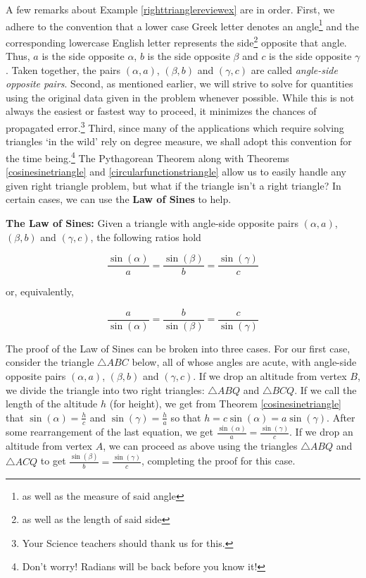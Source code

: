 \begin{ex}
\end{ex} 

A few remarks about Example \ref{righttrianglereviewex}  are in order.  First, we adhere to the convention that a lower case Greek letter denotes an angle\footnote{as well as the measure of said angle} and the corresponding lowercase English letter represents the side\footnote{as well as the length of said side} opposite that angle.  Thus, $a$ is the side opposite $\alpha$, $b$ is the side opposite $\beta$ and $c$ is the side opposite $\gamma$.  Taken together, the pairs $(\alpha, a)$, $(\beta, b)$ and $(\gamma, c)$ are called  \textit{angle-side opposite pairs}.  Second, as mentioned earlier, we will strive to solve for quantities using the original data given in the problem whenever possible. While this is not always the easiest or fastest way to proceed, it minimizes the chances of propagated error.\footnote{Your Science teachers should thank us for this.}  Third, since many of the applications which require solving triangles `in the wild' rely on degree measure, we shall adopt this convention for the time being.\footnote{Don't worry!  Radians will be back before you know it!}  The Pythagorean Theorem along with Theorems \ref{cosinesinetriangle} and \ref{circularfunctionstriangle} allow us to easily handle any given right triangle problem, but what if the triangle isn't a right triangle?  In certain cases, we can use the \textbf{Law of Sines} to help.

\smallskip

\colorbox{ResultColor}{\bbm

\begin{thm}  \label{lawofsines}  \textbf{The Law of Sines:}  Given a triangle with angle-side opposite pairs $(\alpha, a)$, $(\beta, b)$ and $(\gamma, c)$, the following ratios hold

\[ \frac{\sin(\alpha)}{a} = \frac{\sin(\beta)}{b} = \frac{\sin(\gamma)}{c}\]

or, equivalently,

\[ \frac{a}{\sin(\alpha)} = \frac{b}{\sin(\beta)}  = \frac{c}{\sin(\gamma)} \]

\end{thm}
\ebm}

\smallskip

The proof of the Law of Sines can be broken into three cases. For our first case, consider the triangle $\triangle ABC$ below, all of whose angles are acute, with angle-side opposite pairs $(\alpha, a)$, $(\beta, b)$ and $(\gamma, c)$.  If we drop an altitude from vertex $B$, we divide the triangle into two right triangles:  $\triangle ABQ$ and $\triangle BCQ$. If we call the length of the altitude $h$ (for height), we get from Theorem \ref{cosinesinetriangle} that $\sin(\alpha) = \frac{h}{c}$ and $\sin(\gamma) = \frac{h}{a}$ so that $h = c\sin(\alpha) = a \sin(\gamma)$.  After some rearrangement of the last equation, we get $\frac{\sin(\alpha)}{a} = \frac{\sin(\gamma)}{c}$. If we drop an altitude from vertex $A$, we can proceed as above using the triangles $\triangle ABQ$ and $\triangle ACQ$ to get $\frac{\sin(\beta)}{b} = \frac{\sin(\gamma)}{c}$, completing the proof for this case.

